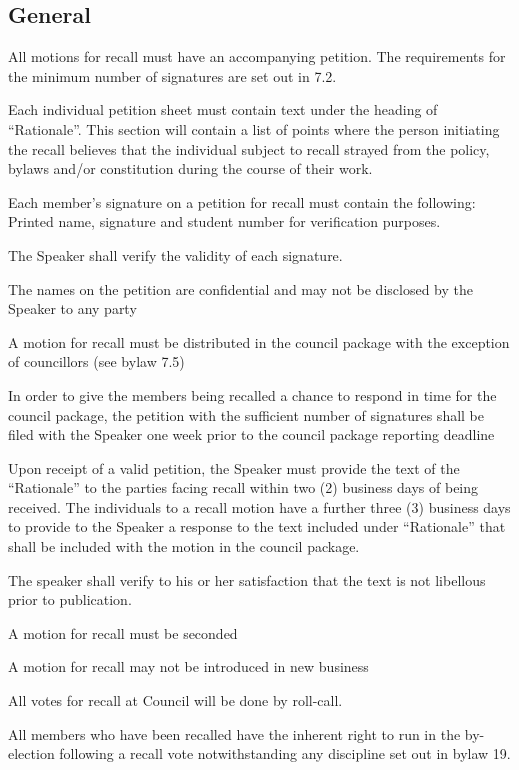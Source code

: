 \subsection{General}
\begin{longenum}[ label*=\thesubsection.\arabic*., align=left]
	\item  All motions for recall must have an accompanying petition. The requirements for the minimum
number of signatures are set out in 7.2.
	\begin{longenum}[ label*=\arabic*., align=left]
		\item Each individual petition sheet must contain text under the heading of ``Rationale''.  This section will contain a list of points where the person initiating the recall believes that the individual subject to recall strayed from the policy, bylaws and/or constitution during the course of their work.
        \item Each member's signature on a petition for recall must contain the following: Printed name, signature and student number for verification purposes.
        \item The Speaker shall verify the validity of each signature.
        \item The names on the petition are confidential and may not be disclosed by the Speaker to any party
    \end{longenum}
    \item A motion for recall must be distributed in the council package with the exception of councillors (see bylaw 7.5)
    \item In order to give the members being recalled a chance to respond in time for the council package, the petition with the sufficient number of signatures shall be filed with the Speaker one week prior to the council package reporting deadline
    \item Upon receipt of a valid petition, the Speaker must provide the text of the ``Rationale'' to the parties facing recall within two (2) business days of being received. The individuals to a recall motion have a further three (3) business days to provide to the Speaker a response to the text included under ``Rationale'' that shall be included with the motion in the council package.
    \item The speaker shall verify to his or her satisfaction that the text is not libellous prior to publication.
    \item A motion for recall must be seconded
    \item A motion for recall may not be introduced in new business
    \item All votes for recall at Council will be done by roll-call.
    \item All members who have been recalled have the inherent right to run in the by-election following a recall vote notwithstanding any discipline set out in bylaw 19.
\end{longenum}

